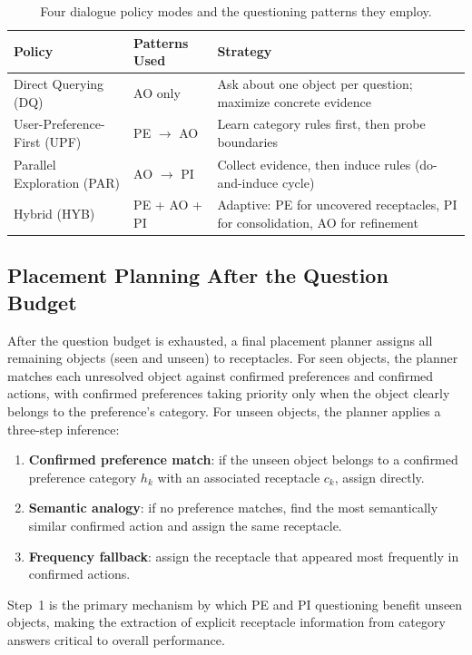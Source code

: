 \documentclass[a4paper,fleqn]{cas-sc}
\begin{document}
\begin{table}[t]
\caption{Four dialogue policy modes and the questioning patterns they employ.}\label{tbl:policies}
\begin{tabular*}{\tblwidth}{@{}llp{6cm}@{}}
\toprule
\textbf{Policy} & \textbf{Patterns Used} & \textbf{Strategy} \\
\midrule
Direct Querying (DQ)    & AO only     & Ask about one object per question; maximize concrete evidence \\
User-Preference-First (UPF) & PE $\to$ AO & Learn category rules first, then probe boundaries \\
Parallel Exploration (PAR) & AO $\to$ PI & Collect evidence, then induce rules (do-and-induce cycle) \\
Hybrid (HYB)            & PE + AO + PI & Adaptive: PE for uncovered receptacles, PI for consolidation, AO for refinement \\
\bottomrule
\end{tabular*}
\end{table}

\subsection{Placement Planning After the Question Budget}\label{sec:planner}

After the question budget is exhausted, a final placement planner assigns all remaining objects (seen and unseen) to receptacles. For seen objects, the planner matches each unresolved object against confirmed preferences and confirmed actions, with confirmed preferences taking priority only when the object clearly belongs to the preference's category. For unseen objects, the planner applies a three-step inference:

\begin{enumerate}[leftmargin=*]
    \item \textbf{Confirmed preference match}: if the unseen object belongs to a confirmed preference category $h_k$ with an associated receptacle $c_k$, assign directly.
    \item \textbf{Semantic analogy}: if no preference matches, find the most semantically similar confirmed action and assign the same receptacle.
    \item \textbf{Frequency fallback}: assign the receptacle that appeared most frequently in confirmed actions.
\end{enumerate}

Step~1 is the primary mechanism by which PE and PI questioning benefit unseen objects, making the extraction of explicit receptacle information from category answers critical to overall performance.
\end{document}
